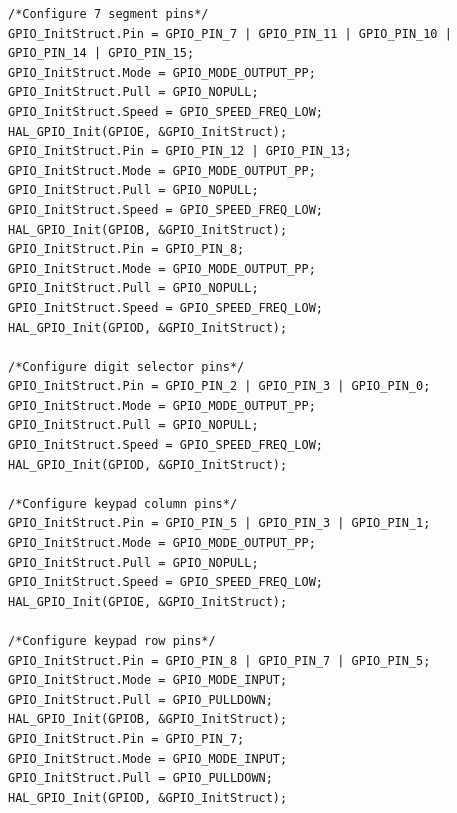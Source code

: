\documentclass[12pt]{report}
\begin{document}
\begin{appendix}
\begin{lstlisting}[basicstyle=\scriptsize\ttfamily]
/*Configure 7 segment pins*/
GPIO_InitStruct.Pin = GPIO_PIN_7 | GPIO_PIN_11 | GPIO_PIN_10 | GPIO_PIN_14 | GPIO_PIN_15;
GPIO_InitStruct.Mode = GPIO_MODE_OUTPUT_PP;
GPIO_InitStruct.Pull = GPIO_NOPULL;
GPIO_InitStruct.Speed = GPIO_SPEED_FREQ_LOW;
HAL_GPIO_Init(GPIOE, &GPIO_InitStruct);
GPIO_InitStruct.Pin = GPIO_PIN_12 | GPIO_PIN_13;
GPIO_InitStruct.Mode = GPIO_MODE_OUTPUT_PP;
GPIO_InitStruct.Pull = GPIO_NOPULL;
GPIO_InitStruct.Speed = GPIO_SPEED_FREQ_LOW;
HAL_GPIO_Init(GPIOB, &GPIO_InitStruct);
GPIO_InitStruct.Pin = GPIO_PIN_8;
GPIO_InitStruct.Mode = GPIO_MODE_OUTPUT_PP;
GPIO_InitStruct.Pull = GPIO_NOPULL;
GPIO_InitStruct.Speed = GPIO_SPEED_FREQ_LOW;
HAL_GPIO_Init(GPIOD, &GPIO_InitStruct);

/*Configure digit selector pins*/
GPIO_InitStruct.Pin = GPIO_PIN_2 | GPIO_PIN_3 | GPIO_PIN_0;
GPIO_InitStruct.Mode = GPIO_MODE_OUTPUT_PP;
GPIO_InitStruct.Pull = GPIO_NOPULL;
GPIO_InitStruct.Speed = GPIO_SPEED_FREQ_LOW;
HAL_GPIO_Init(GPIOD, &GPIO_InitStruct);

/*Configure keypad column pins*/
GPIO_InitStruct.Pin = GPIO_PIN_5 | GPIO_PIN_3 | GPIO_PIN_1;
GPIO_InitStruct.Mode = GPIO_MODE_OUTPUT_PP;
GPIO_InitStruct.Pull = GPIO_NOPULL;
GPIO_InitStruct.Speed = GPIO_SPEED_FREQ_LOW;
HAL_GPIO_Init(GPIOE, &GPIO_InitStruct);

/*Configure keypad row pins*/
GPIO_InitStruct.Pin = GPIO_PIN_8 | GPIO_PIN_7 | GPIO_PIN_5;
GPIO_InitStruct.Mode = GPIO_MODE_INPUT;
GPIO_InitStruct.Pull = GPIO_PULLDOWN;
HAL_GPIO_Init(GPIOB, &GPIO_InitStruct);
GPIO_InitStruct.Pin = GPIO_PIN_7;
GPIO_InitStruct.Mode = GPIO_MODE_INPUT;
GPIO_InitStruct.Pull = GPIO_PULLDOWN;
HAL_GPIO_Init(GPIOD, &GPIO_InitStruct);
	\end{lstlisting}
	
	\newpage
	

\end{appendix}
\end{document}
